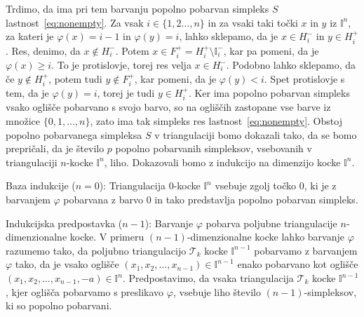 \documentclass[mat1]{fmfdelo}
\newcommand{\I}{\mathbb I}
\newcommand{\0}{0}
\newcommand{\pT}{\mathcal T}
\begin{document}
\begin{dokaz}
Trdimo, da ima pri tem barvanju popolno pobarvan simpleks $S$ lastnost~\eqref{eq:nonempty}. 
Za vsak $i \in \{1, 2 \dots, n \}$ in za vsaki taki točki $x$ in $y$ iz $\I^n$, za kateri je $\varphi(x) = i - 1$ in $\varphi(y) = i$, lahko sklepamo, da je $x \in H_{i}^-$ in $y \in H_i^+$. Res, denimo, da $x \notin H_{i}^-$. Potem $x \in F_i^+ = H_{i}^+ \setminus \I_i^-$, kar pa pomeni, da je $\varphi(x) \geq i$. To je protislovje, torej res velja $x \in H_{i}^-$. Podobno lahko sklepamo, da če $y \notin H_i^+$, potem tudi $y \notin F_i^+$, kar pomeni, da je $\varphi(y) < i$. Spet protislovje s tem, da je $\varphi(y) = i$, torej je tudi $y \in H_i^+$.
Ker ima popolno pobarvan simpleks vsako oglišče pobarvano s svojo barvo, so na ogliščih zastopane vse barve iz množice $\{ 0, 1, \dots, n \}$, zato ima tak simpleks res lastnost~\eqref{eq:nonempty}. 
Obstoj popolno pobarvanega simpleksa $S$ v triangulaciji bomo dokazali tako, da se bomo prepričali, da je število $p$ popolno pobarvanih simpleksov, vsebovanih v triangulaciji $n$-kocke $\I^n$, liho. Dokazovali bomo z indukcijo na dimenzijo kocke $\I^n$.

Baza indukcije ($n = 0$):
Triangulacija $0$-kocke $\I^n$ vsebuje zgolj točko $\0$, ki je z barvanjem $\varphi$ pobarvana z barvo $0$ in tako predstavlja popolno pobarvan simpleks.

Indukcijska predpostavka ($n - 1$):
Barvanje $\varphi$ pobarva poljubne triangulacije $n$-dimenzionalne kocke. V primeru $(n-1)$-dimenzionalne kocke lahko barvanje $\varphi$ razumemo tako, da poljubno triangulacijo $\pT_k$ kocke $\I^{n-1}$ pobarvamo z barvanjem $\varphi$ tako, da je vsako oglišče $(x_1, x_2, \dots, x_{n-1})\in\I^{n-1}$ enako pobarvano kot oglišče $(x_1, x_2, \dots, x_{n-1}, -a)\in \I^n$. Predpostavimo, da vsaka triangulacija $\pT_k$ kocke $\I^{n-1}$, kjer oglišča pobarvamo s preslikavo $\varphi$, vsebuje liho število $(n - 1)$-simpleksov, ki so popolno pobarvani.


\end{dokaz}
\end{document}
